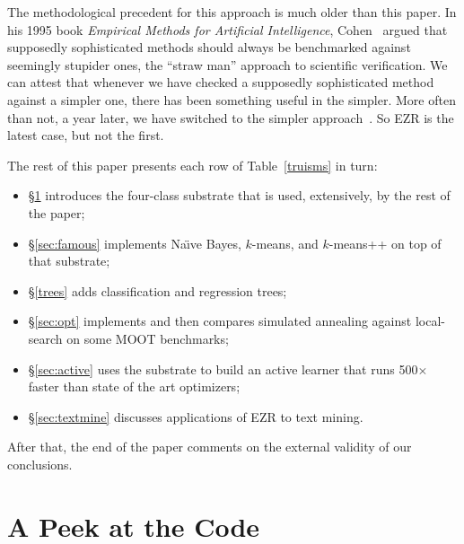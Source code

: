 \documentclass[AMA,STIX2COL]{WileyNJDv5}
\begin{document}
The methodological precedent for this approach is much older than this paper.
In his 1995 book {\em
Empirical Methods for Artificial Intelligence},
Cohen~\cite{cohen1995empirical} argued that supposedly
sophisticated methods should always be benchmarked against
seemingly stupider ones, the ``straw man'' approach to
scientific verification. We can attest that whenever we have
checked a supposedly sophisticated method against a simpler one,
there has been something useful in the simpler. More often than
not, a year later, we have switched to the simpler
approach~\cite{Nair17a,agrawal2019dodge,tantithamthavorn2016automated,
fu2016tuning}. So EZR is the latest case, but not the first.
 
The rest of this paper presents each row of
Table~\ref{truisms} in turn:
\begin{itemize}
\item
\S\ref{sec:peek} introduces the four-class substrate that is used, extensively, by the rest of the paper;
\item
\S\ref{sec:famous} implements Na\"{\i}ve Bayes, $k$-means, and
$k$-means++ on top of that substrate;
\item
\S\ref{trees} adds classification and regression trees;
\item 
\S\ref{sec:opt} implements and then compares simulated annealing against
local-search   on some MOOT benchmarks;
\item
\S\ref{sec:active} uses the substrate to build an active learner that runs
500$\times$ faster than   state of the art optimizers;
\item
 \S\ref{sec:textmine} discusses applications of EZR to text mining.
 \end{itemize}
 After that, the end of the paper comments on the external validity of
 our conclusions.   
\section{A Peek at the Code}\label{sec:peek}
\end{document}

